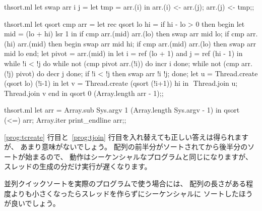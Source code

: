 \begin{answer}
\begin{codefile}{thsort.ml}
let swap arr i j =
  let tmp = arr.(i) in
  arr.(i) <- arr.(j);
  arr.(j) <- tmp;;
\end{codefile}
\begin{listingcodefile}[style=numbers]{thsort.ml}
let qsort cmp arr =
  let rec qsort lo hi =
  if hi - lo > 0 then
    begin
      let mid = (lo + hi) lsr 1 in
      if cmp arr.(mid) arr.(lo) then swap arr mid lo;
      if cmp arr.(hi) arr.(mid) then
        begin
          swap arr mid hi;
          if cmp arr.(mid) arr.(lo) then swap arr mid lo
        end;
      let pivot = arr.(mid) in
      let i = ref (lo + 1) and j = ref (hi - 1) in
      while !i < !j do
        while not (cmp pivot arr.(!i)) do incr i done;
        while not (cmp arr.(!j) pivot) do decr j done;
        if !i < !j then swap arr !i !j;
      done;
      let u = Thread.create (qsort lo) (!i-1) in
      let v = Thread.create (qsort (!i+1)) hi in $\label{prog:tcreate}$
      Thread.join u; $\label{prog:tjoin}$
      Thread.join v
    end in
  qsort 0 (Array.length arr - 1);;
\end{listingcodefile}
%
\begin{codefile}{thsort.ml}
let arr = Array.sub Sys.argv 1 (Array.length Sys.argv - 1) in
qsort (<=) arr;
Array.iter print_endline arr;;
\end{codefile}
%
\ref{prog:tcreate} 行目と~\ref{prog:tjoin} 行目を入れ替えても正しい答えは得られますが、
あまり意味がないでしょう。
配列の前半分がソートされてから後半分のソートが始まるので、
動作はシーケンシャルなプログラムと同じになりますが、スレッドの生成の分だけ実行が遅くなります。

並列クイックソートを実際のプログラムで使う場合には、
配列の長さがある程度よりも小さくなったらスレッドを作らずにシーケンシャルに
ソートしたほうが良いでしょう。
\end{answer}

